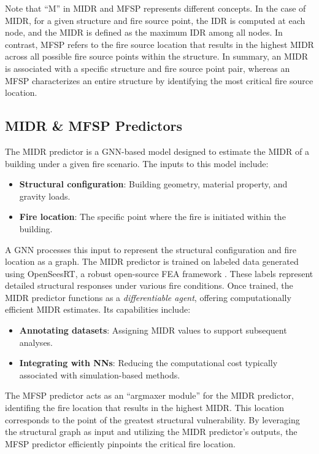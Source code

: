{Note that ``M'' in MIDR and MFSP represents different concepts. In the case of MIDR, for a given structure and fire source point, the IDR is computed at each node, and the MIDR is defined as the maximum IDR among all nodes. In contrast, MFSP refers to the fire source location that results in the highest MIDR across all possible fire source points within the structure. In summary, an MIDR is associated with a specific structure and fire source point pair, whereas an MFSP characterizes an entire structure by identifying the most critical fire source location.

}

\subsection{MIDR \& MFSP Predictors}

The MIDR predictor is a GNN-based model designed to estimate the MIDR of a building under a given fire scenario. The inputs to this model include:
\begin{itemize}
    \item {\bf{Structural configuration}}: Building geometry, material property, and gravity loads. 
    \item {\bf{Fire location}}: The specific point where the fire is initiated within the building.
\end{itemize}
A GNN processes this input to represent the structural configuration and fire location as a graph. The MIDR predictor is trained on labeled data generated using OpenSeesRT, a robust open-source FEA framework \cite{perez2024openseesrt}. These labels represent detailed structural responses under various fire conditions. Once trained, the MIDR predictor functions as a {\em{differentiable agent}}, offering computationally efficient MIDR estimates. Its capabilities include:
\begin{itemize}
    \item {\bf{Annotating datasets}}: Assigning  MIDR values to support subsequent analyses.
    \item {\bf{Integrating with NNs}}: Reducing the computational cost typically associated with simulation-based methods.
\end{itemize}

The MFSP predictor acts as an ``argmaxer module'' for the MIDR predictor, identifing the fire location that results in the highest MIDR. This location corresponds to the point of the greatest structural vulnerability. By leveraging the structural graph as input and utilizing the MIDR predictor's outputs, the MFSP predictor efficiently pinpoints the critical fire location.

